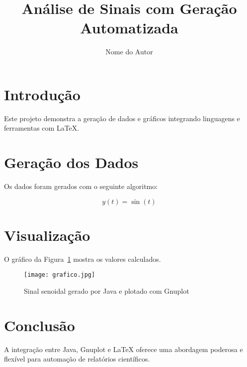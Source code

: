 \documentclass[twocolumn,10pt]{article}
\title{\bfseries Análise de Sinais com Geração Automatizada}
\author{Nome do Autor}
\date{}
\begin{document}

\section{Introdução}
Este projeto demonstra a geração de dados e gráficos integrando linguagens e ferramentas com LaTeX.

\section{Geração dos Dados}
Os dados foram gerados com o seguinte algoritmo:

\begin{equation}
y(t) = \sin(t)
\end{equation}

\section{Visualização}
O gráfico da Figura~\ref{fig:grafico} mostra os valores calculados.

\begin{figure}[H]
\centering
\texttt{[image: grafico.jpg]}
\caption{Sinal senoidal gerado por Java e plotado com Gnuplot}
\label{fig:grafico}
\end{figure}

\section{Conclusão}
A integração entre Java, Gnuplot e LaTeX oferece uma abordagem poderosa e flexível para automação de relatórios científicos.
\end{document}
